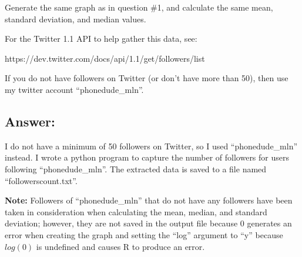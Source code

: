 \documentclass[a4paper, 11pt]{article}
\begin{document}
Generate the same graph as in question \#1, and calculate the same 
mean, standard deviation, and median values.

For the Twitter 1.1 API to help gather this data, see:

https://dev.twitter.com/docs/api/1.1/get/followers/list

If you do not have followers on Twitter (or don't have more than 50),
then use my twitter account ``phonedude\_mln''.

\subsection*{Answer:}

I do not have a minimum of 50 followers on Twitter, so I used ``phonedude\_mln'' instead. I wrote a python program to capture the number of followers for users following ``phonedude\_mln''. The extracted data is saved to a file named ``followerscount.txt''.

\textbf{Note:}
Followers of ``phonedude\_mln'' that do not have any followers have been taken in consideration when calculating the mean, median, and standard deviation; however, they are not saved in the output file because 0 generates an error when creating the graph and setting the ``log'' argument to ``y'' because $log(0)$ is undefined and causes R to produce an error.




\end{document}
